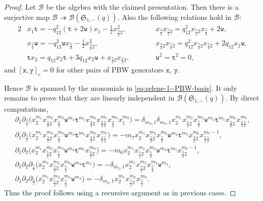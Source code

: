 \documentclass[10pt,a4paper]{amsart}
\numberwithin{equation}{section}
\newcommand{\toba}{\mathscr B}
\newcommand{\sele}{\mathfrak{S}}
\newcommand{\ttt}{\mathtt{t}}
\newcommand{\wt}{\mathtt{w}}
\newcommand{\xt}{\mathtt{x}}
\newcommand{\yt}{\mathtt{y}}
\newcommand{\tresdos}{\frac{3}{2}}
\newcommand{\cincodos}{\frac{5}{2}}
\begin{document}
\begin{proof}
Let $\toba$ be the algebra with the claimed presentation. Then
there is a surjective map $\toba \twoheadrightarrow \toba(\sele_{1,-}(q))$.
Also the following relations hold in $\toba$:{\samepage
\begin{alignat*}{2}
&x_1\ttt =-q_{12}^2(\ttt+2\wt)x_1 -\tfrac{1}{2}x_{\tresdos2}^2,
&&x_{\tresdos}x_{\cincodos2} = q_{12}^2x_{\cincodos2}x_{\tresdos}+2\wt,
\\
&x_\tresdos\wt =-q_{12}^2\wt x_{\tresdos} -\tfrac{1}{2}x_{\tresdos2}^2,
&&x_{\tresdos2}x_{\cincodos2} = q_{12}^2x_{\cincodos2}x_{\tresdos2}+2q_{12}x_2\wt,
\\
&\ttt x_{2} = q_{12}x_2\ttt+3q_{12}x_2\wt+x_{\cincodos2}x_{\tresdos2},\qquad
&&\wt^2 = \ttt^2 =0,
\end{alignat*}}
and $[\xt,\yt]_c=0$ for other pairs of PBW generators $\xt$, $\yt$.

Hence $\toba$ is spanned by the monomials in \eqref{eq:selene-1--PBW-basis}.
It only remains to prove that they are linearly independent in $\toba(\sele_{1,-}(q))$. By direct computations,
\begin{gather*}
\partial_1\partial_{\tresdos} \big(x_{2}^{m_1}x_{\cincodos2}^{m_2}x_{\cincodos}^{m_3}\wt^{m_4}\ttt^{m_5} x_{\tresdos2}^{m_6}x_{\tresdos\cincodos}^{m_7} x_{\tresdos}^{m_8} x_1^{m_9} \big)
=\delta_{m_9,1}\delta_{m_8,1} x_{2}^{m_1}x_{\cincodos2}^{m_2}x_{\cincodos}^{m_3}\wt^{m_4}\ttt^{m_5} x_{\tresdos2}^{m_6}x_{\tresdos\cincodos}^{m_7},
\\
\partial_1\partial_{\cincodos} \big(x_{2}^{m_1}x_{\cincodos2}^{m_2}x_{\cincodos}^{m_3}\wt^{m_4}\ttt^{m_5} x_{\tresdos2}^{m_6}x_{\tresdos\cincodos}^{m_7} \big)
=-m_7 x_{2}^{m_1}x_{\cincodos2}^{m_2}x_{\cincodos}^{m_3}\wt^{m_4}\ttt^{m_5} x_{\tresdos2}^{m_6}x_{\tresdos\cincodos}^{m_7-1},
\\
\partial_1\partial_{2} \big(x_{2}^{m_1}x_{\cincodos2}^{m_2}x_{\cincodos}^{m_3}\wt^{m_4}\ttt^{m_5} x_{\tresdos2}^{m_6} \big)
= -m_6 x_{2}^{m_1}x_{\cincodos2}^{m_2}x_{\cincodos}^{m_3}\wt^{m_4}\ttt^{m_5} x_{\tresdos2}^{m_6-1},
\\
\partial_1\partial_{2}\partial_{\cincodos} \big(x_{2}^{m_1}x_{\cincodos2}^{m_2}x_{\cincodos}^{m_3}\wt^{m_4}\ttt^{m_5}\big)
= -\delta_{m_5,1} x_{2}^{m_1}x_{\cincodos2}^{m_2}x_{\cincodos}^{m_3}\wt^{m_4},
\\
\partial_1\partial_{2}\partial_{\cincodos} \big(x_{2}^{m_1}x_{\cincodos2}^{m_2}x_{\cincodos}^{m_3}\wt^{m_4}\big)
= -\delta_{m_4,1} x_{2}^{m_1}x_{\cincodos2}^{m_2}x_{\cincodos}^{m_3}.
\end{gather*}
Thus the proof follows using a recursive argument as in previous cases.
\end{proof}
\end{document}
